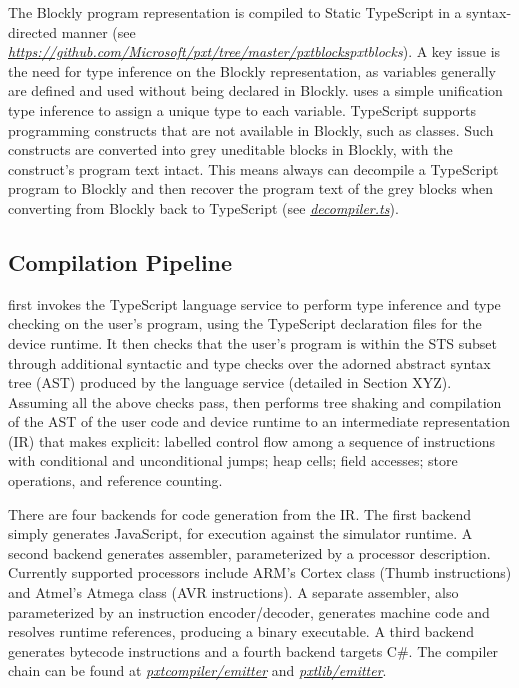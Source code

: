 The Blockly program representation is compiled to Static TypeScript in a syntax-directed manner
(see \emph{\url{https://github.com/Microsoft/pxt/tree/master/pxtblocks}{pxtblocks}}). A key issue is the need for
type inference on the Blockly representation, as variables generally are defined and used without
being declared in Blockly. \MC uses a simple unification type inference to assign a
unique type to each variable.  
TypeScript supports programming constructs that are not available in Blockly, such as classes.
Such constructs are converted into grey uneditable blocks in Blockly, with the construct's program
text intact. This means \MC always can decompile a TypeScript program to Blockly and then recover
the program text of the grey blocks when converting from Blockly back to TypeScript
 (see \emph{\href{https://github.com/Microsoft/pxt/blob/master/pxtcompiler/emitter/decompiler.ts}{decompiler.ts}}). 

\subsection{Compilation Pipeline}

\MC first invokes the TypeScript language service to perform type inference and type checking on the 
user's program, using the TypeScript declaration files for the device runtime.   It then checks that the
user's program is within the STS subset through additional syntactic and type checks over the adorned
abstract syntax tree (AST) produced by the language service (detailed in Section XYZ).  Assuming all the
above checks pass, \MC then performs tree shaking and compilation of the AST of the user code and
device runtime to an intermediate representation (IR) that makes explicit: labelled control flow among a
sequence of instructions with conditional and unconditional jumps; heap cells; field accesses; store operations,
and reference counting.

There are four backends for code generation from the IR. The first backend simply generates JavaScript,
for execution against the simulator runtime.  A second backend generates assembler, parameterized by a
processor description.  Currently supported processors include ARM's Cortex class (Thumb instructions)
and Atmel's Atmega class (AVR instructions). A separate assembler, also parameterized by an instruction
encoder/decoder, generates machine code and resolves runtime references, producing a binary executable.
A third backend generates bytecode instructions and a fourth backend targets C\#. 
The compiler chain
can be found at \emph{\href{https://github.com/Microsoft/pxt/tree/master/pxtcompiler/emitter}{pxtcompiler/emitter}} and 
\emph{\href{https://github.com/Microsoft/pxt/tree/master/pxtlib/emitter}{pxtlib/emitter}}.



